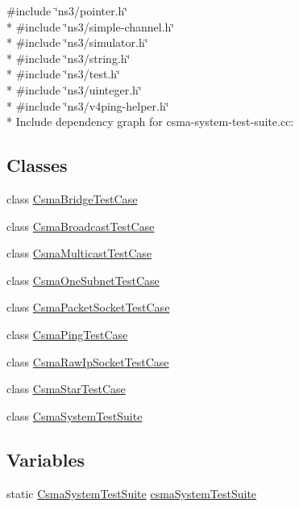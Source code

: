 {\ttfamily \#include \char`\"{}ns3/pointer.\+h\char`\"{}}\\*
{\ttfamily \#include \char`\"{}ns3/simple-\/channel.\+h\char`\"{}}\\*
{\ttfamily \#include \char`\"{}ns3/simulator.\+h\char`\"{}}\\*
{\ttfamily \#include \char`\"{}ns3/string.\+h\char`\"{}}\\*
{\ttfamily \#include \char`\"{}ns3/test.\+h\char`\"{}}\\*
{\ttfamily \#include \char`\"{}ns3/uinteger.\+h\char`\"{}}\\*
{\ttfamily \#include \char`\"{}ns3/v4ping-\/helper.\+h\char`\"{}}\\*
Include dependency graph for csma-\/system-\/test-\/suite.cc\+:
\subsection*{Classes}
\begin{DoxyCompactItemize}
\item 
class \hyperlink{classCsmaBridgeTestCase}{Csma\+Bridge\+Test\+Case}
\item 
class \hyperlink{classCsmaBroadcastTestCase}{Csma\+Broadcast\+Test\+Case}
\item 
class \hyperlink{classCsmaMulticastTestCase}{Csma\+Multicast\+Test\+Case}
\item 
class \hyperlink{classCsmaOneSubnetTestCase}{Csma\+One\+Subnet\+Test\+Case}
\item 
class \hyperlink{classCsmaPacketSocketTestCase}{Csma\+Packet\+Socket\+Test\+Case}
\item 
class \hyperlink{classCsmaPingTestCase}{Csma\+Ping\+Test\+Case}
\item 
class \hyperlink{classCsmaRawIpSocketTestCase}{Csma\+Raw\+Ip\+Socket\+Test\+Case}
\item 
class \hyperlink{classCsmaStarTestCase}{Csma\+Star\+Test\+Case}
\item 
class \hyperlink{classCsmaSystemTestSuite}{Csma\+System\+Test\+Suite}
\end{DoxyCompactItemize}
\subsection*{Variables}
\begin{DoxyCompactItemize}
\item 
static \hyperlink{classCsmaSystemTestSuite}{Csma\+System\+Test\+Suite} \hyperlink{csma-system-test-suite_8cc_a74341db8ef79ad754e8cb0be9d02f91b}{csma\+System\+Test\+Suite}
\end{DoxyCompactItemize}



